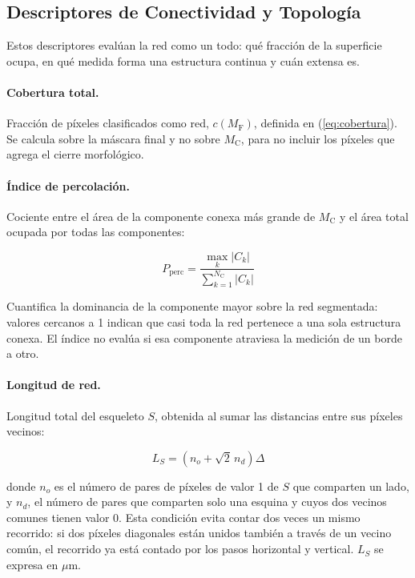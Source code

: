 \subsection{Descriptores de Conectividad y Topología}

Estos descriptores evalúan la red como un todo: qué fracción de la superficie ocupa, en qué medida forma una estructura continua y cuán extensa es.

\paragraph{Cobertura total.}
Fracción de píxeles clasificados como red, $c(M_{\mathrm{F}})$, definida en (\ref{eq:cobertura}). Se calcula sobre la máscara final y no sobre $M_{\mathrm{C}}$, para no incluir los píxeles que agrega el cierre morfológico.

\paragraph{Índice de percolación.}
Cociente entre el área de la componente conexa más grande de $M_{\mathrm{C}}$ y el área total ocupada por todas las componentes:

\begin{equation}
P_{\mathrm{perc}} = \frac{\max_k |C_k|}{\sum_{k=1}^{N_{\mathrm{C}}} |C_k|}
\label{eq:percolacion}
\end{equation}

Cuantifica la dominancia de la componente mayor sobre la red segmentada: valores cercanos a 1 indican que casi toda la red pertenece a una sola estructura conexa. El índice no evalúa si esa componente atraviesa la medición de un borde a otro.

\paragraph{Longitud de red.}
Longitud total del esqueleto $S$, obtenida al sumar las distancias entre sus píxeles vecinos:

\begin{equation}
L_S = \left(n_o + \sqrt{2}\, n_d\right) \Delta
\label{eq:longitud}
\end{equation}

donde $n_o$ es el número de pares de píxeles de valor 1 de $S$ que comparten un lado, y $n_d$, el número de pares que comparten solo una esquina y cuyos dos vecinos comunes tienen valor 0. Esta condición evita contar dos veces un mismo recorrido: si dos píxeles diagonales están unidos también a través de un vecino común, el recorrido ya está contado por los pasos horizontal y vertical. $L_S$ se expresa en $\mu$m.

